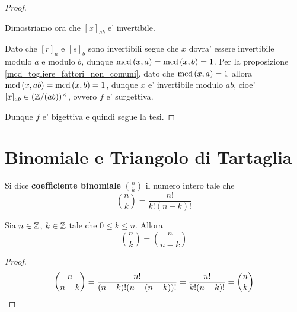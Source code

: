 \begin{proof}
\begin{description}
        Dimostriamo ora che $[x]_{ab}$ e' invertibile.
                
        Dato che $[r]_a$ e $[s]_b$ sono invertibili segue che $x$ dovra' essere invertibile modulo $a$ e modulo $b$, dunque $\operatorname{mcd}\left(x, a\right) = \operatorname{mcd}\left(x, b\right) = 1$. Per la proposizione \ref{mcd_togliere_fattori_non_comuni}, dato che $\operatorname{mcd}\left(x, a\right) = 1$ allora $\operatorname{mcd}\left(x, ab\right) = \operatorname{mcd}\left(x, b\right) = 1$, dunque $x$ e' invertibile modulo $ab$, cioe' $[x]_{ab} \in (\mathbb{Z}/(ab))^{\times}$, ovvero $f$ e' surgettiva.
    \end{description}

    Dunque $f$ e' bigettiva e quindi segue la tesi.
\end{proof}

\section{Binomiale e Triangolo di Tartaglia}

\begin{definition}
    Si dice \textbf{coefficiente binomiale} $\binom{n}{k}$ il numero intero tale che \begin{equation}
        \binom{n}{k} = \frac{n!}{k!(n-k)!}
    \end{equation}    
\end{definition}

\begin{proposition}\label{simmetria_binomiale}
    Sia $n \in \mathbb{Z}$, $k \in \mathbb{Z}$ tale che $0 \leq k \leq n$. Allora \begin{equation}
        \binom{n}{k} = \binom{n}{n-k}
    \end{equation}
\end{proposition}
\begin{proof}
    \[\binom{n}{n - k} = \frac{n!}{(n-k)!(n-(n-k))!} = \frac{n!}{k!(n-k)!} = \binom{n}{k} \qedhere\]
\end{proof}

